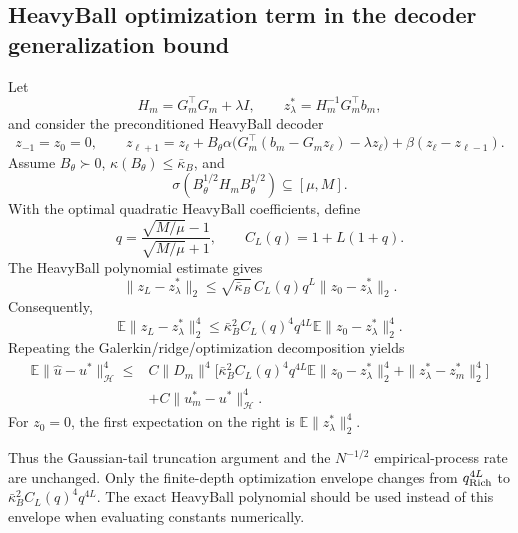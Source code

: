 
\subsection{HeavyBall optimization term in the decoder generalization bound}

Let
\[
 H_m=G_m^\top G_m+\lambda I,
 \qquad
 z_\lambda^*=H_m^{-1}G_m^\top b_m,
\]
and consider the preconditioned HeavyBall decoder
\begin{equation}
 z_{-1}=z_0=0,
 \qquad
 z_{\ell+1}=z_\ell+B_\theta\alpha
 \bigl(G_m^\top(b_m-G_mz_\ell)-\lambda z_\ell\bigr)
 +\beta(z_\ell-z_{\ell-1}).
 \label{eq:gen-hb}
\end{equation}
Assume $B_\theta\succ0$, $\kappa(B_\theta)\leq\bar\kappa_B$, and
\[
 \sigma(B_\theta^{1/2}H_mB_\theta^{1/2})\subseteq[\mu,M].
\]
With the optimal quadratic HeavyBall coefficients, define
\[
 q=\frac{\sqrt{M/\mu}-1}{\sqrt{M/\mu}+1},
 \qquad
 C_L(q)=1+L(1+q).
\]
The HeavyBall polynomial estimate gives
\begin{equation}
 \|z_L-z_\lambda^*\|_2
 \leq
 \sqrt{\bar\kappa_B}\,C_L(q)q^L
 \|z_0-z_\lambda^*\|_2.
 \label{eq:gen-hb-error}
\end{equation}
Consequently,
\begin{equation}
 \mathbb E\|z_L-z_\lambda^*\|_2^4
 \leq
 \bar\kappa_B^2 C_L(q)^4q^{4L}
 \mathbb E\|z_0-z_\lambda^*\|_2^4.
 \label{eq:gen-hb-fourth}
\end{equation}
Repeating the Galerkin/ridge/optimization decomposition yields
\begin{equation}
\boxed{
\begin{aligned}
 \mathbb E\|\widehat u-u^*\|_{\mathcal H}^4
 \leq{}&C\|D_m\|^4
 \bigl[
 \bar\kappa_B^2 C_L(q)^4q^{4L}
 \mathbb E\|z_0-z_\lambda^*\|_2^4
 +\|z_\lambda^*-z_m^*\|_2^4
 \bigr]\\
 &+C\|u_m^*-u^*\|_{\mathcal H}^4.
\end{aligned}}
\label{eq:gen-hb-fourth-output}
\end{equation}
For $z_0=0$, the first expectation on the right is
$\mathbb E\|z_\lambda^*\|_2^4$.

Thus the Gaussian-tail truncation argument and the $N^{-1/2}$ empirical-process
rate are unchanged.  Only the finite-depth optimization envelope changes from
$q_{\rm Rich}^{4L}$ to
$\bar\kappa_B^2C_L(q)^4q^{4L}$.  The exact HeavyBall polynomial should be used
instead of this envelope when evaluating constants numerically.

